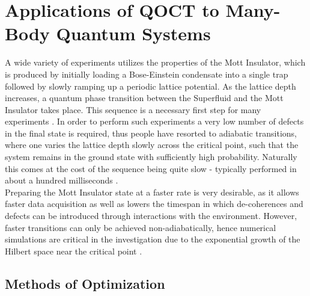\chapter{Applications of QOCT to Many-Body Quantum Systems}

A wide variety of experiments utilizes the properties of the Mott Insulator, which is produced by initially loading a Bose-Einstein condensate into a single trap followed by slowly ramping up a periodic lattice potential. As the lattice depth increases, a quantum phase transition between the Superfluid and the Mott Insulator takes place. This sequence is a necessary first step for many experiments \cite{manybodyBloch}. In order to perform such experiments a very low number of defects in the final state is required, thus people have resorted to adiabatic transitions, where one varies the lattice depth slowly across the critical point, such that the system remains in the ground state with sufficiently high probability. Naturally this comes at the cost of the sequence being quite slow - typically performed in about a hundred milliseconds \cite{JakschZoller}.\\
Preparing the Mott Insulator state at a faster rate is very desirable, as it allows faster data acquisition as well as lowers the timespan in which de-coherences and defects can be introduced through interactions with the environment. However, faster transitions can only be achieved non-adiabatically, hence numerical simulations are critical in the investigation due to the exponential growth of the Hilbert space near the critical point \cite{Vidal2003}.

\section{Methods of Optimization}

